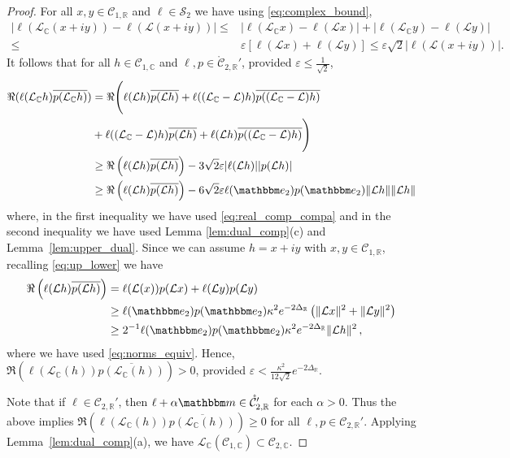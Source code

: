 \documentclass[10pt,a4paper]{amsart}
\newcommand\bC{{\mathbb C}}
\newcommand\bR{{\mathbb R}}
\newcommand\cC{{\mathcal C}}
\newcommand\cL{{\mathcal L}}
\newcommand\cS{{\mathcal S}}
\newcommand\ve{\varepsilon}
\newcommand{\bbe}{\mathbbm e}
\newcommand{\bbm}{\mathbbm m}
\begin{document}
\begin{proof}
For all $x,y\in \cC_{1,\bR}$ and $\ell\in\cS_2$ we have using \eqref{eq:complex_bound},
\begin{equation}\label{eq:real_comp_compa}
\begin{split}
\left|\ell(\cL_{\bC} (x+iy))-\ell(\cL (x+iy))\right|\leq& \left|\ell(\cL_{\bC} x)-\ell(\cL x)\right|
+\left|\ell(\cL_{\bC} y)-\ell(\cL y)\right|\\
\leq& \ve [\ell(\cL x)+ \ell(\cL y)]\leq \ve  \sqrt 2 |\ell(\cL (x+iy))|.
\end{split}
\end{equation}
It follows that for all $h\in\cC_{1,\bC}$ and $\ell,p\in\mathring\cC_{2,\bR}'$, provided $\ve\leq \frac{1}{\sqrt 2}$,
\[
\begin{split}
\Re(\ell(\cL_{\bC} h)\overline{p(\cL_{\bC} h)})
& =
\Re\Bigg(\ell(\cL h)\overline{p(\cL h)}  + \ell((\cL_{\bC}-\cL) h )\overline{p((\cL_{\bC}-\cL) h )}  \\
& +\ell((\cL_{\bC}-\cL) h)\overline{p(\cL h )}+\ell(\cL h )\overline{p((\cL_{\bC}-\cL) h )} \Bigg)\\
&\geq \Re\left(\ell(\cL h )\overline{p(\cL h)}\right)
- 3 \sqrt 2\ve|\ell(\cL h )||{p(\cL h )}|\\
&\geq \Re\left(\ell(\cL h )\overline{p(\cL h)}\right)
-6\sqrt 2\ve \ell(\bbe_2)p(\bbe_2)\|\cL h\|\|\cL h \|
\end{split}
\]
where, in the first inequality we have used \eqref{eq:real_comp_compa} and in the second inequality we have
used Lemma \ref{lem:dual_comp}(c) and Lemma~\ref{lem:upper_dual}. 
Since we can assume $h=x+iy$ with $x,y\in \cC_{1,\bR}$, recalling \eqref{eq:up_lower} we have
\[
\begin{split}
\Re\left(\ell(\cL h )\overline{p(\cL h )}\right) & = \ell(\cL(x))p(\cL x )+\ell(\cL y )p(\cL y)\\
& \geq \ell(\bbe_2)p(\bbe_2)\kappa^2 e^{-2\Delta_\bR} \left( \|\cL x\|^2 + \|\cL y \|^2 \right) \\
& \geq  2^{-1} \ell(\bbe_2)p(\bbe_2)\kappa^2 e^{-2\Delta_\bR} \| \cL h \|^2 \, , 
\end{split}
\]
where we have used \eqref{eq:norms_equiv}.  Hence, $\Re(\ell(\cL_{\bC}(h))\overline{p(\cL_{\bC}(h))})>0$, provided $\ve < \frac{\kappa^2}{ 12 \sqrt 2}e^{-2\Delta_\bR}$. 

Note that if $\ell \in \cC_{2,\bR}'$, then $\ell+\alpha\bbm\in\mathring\cC_{2,\bR}'$ for each $\alpha>0$.  Thus the above implies $\Re(\ell(\cL_{\bC}(h))\overline{p(\cL_{\bC}(h))}) \ge 0$ for
all $\ell, p \in \cC_{2, \bR}'$. 
Applying Lemma~\ref{lem:dual_comp}(a), 
 we have $\cL_{\bC}(\cC_{1,\bC})\subset \cC_{2,\bC}$.


\end{proof}
\end{document}

